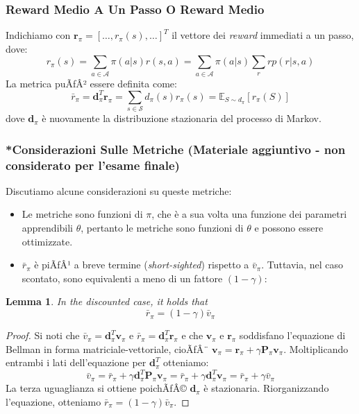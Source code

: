 ﻿\documentclass[11pt, a4paper]{report}
\newtheorem{lemma}{Lemma}
\begin{document}
\subsubsection{Reward Medio A Un Passo O Reward Medio}
Indichiamo con $\bm{r}_{\pi} = [\dots, r_{\pi}(s), \dots]^T$ il vettore dei \emph{reward} immediati a un passo, dove:
\begin{equation}
r_{\pi}(s) = \sum_{a \in \mathcal{A}} \pi(a|s) r(s, a) = \sum_{a \in \mathcal{A}} \pi(a|s) \sum_r r p(r|s, a)
\end{equation}
La metrica puÃƒÂ² essere definita come:
\begin{equation}
\bar{r}_{\pi} = \bm{d}_{\pi}^T \bm{r}_{\pi} = \sum_{s \in \mathcal{S}} d_{\pi}(s) r_{\pi}(s) = \mathbb{E}_{S \sim d_{\pi}} [r_{\pi}(S)]
\end{equation}
dove $\bm{d}_{\pi}$ è nuovamente la distribuzione stazionaria del processo di Markov.

\subsubsection{*Considerazioni Sulle Metriche {\normalfont\small(Materiale aggiuntivo - non considerato per l'esame finale)}}
Discutiamo alcune considerazioni su queste metriche:
\begin{itemize}
    \item Le metriche sono funzioni di $\pi$, che è a sua volta una funzione dei parametri apprendibili $\theta$, pertanto le metriche sono funzioni di $\theta$ e possono essere ottimizzate.
    \item $\bar{r}_{\pi}$ è piÃƒÂ¹ a breve termine (\emph{short-sighted}) rispetto a $\bar{v}_{\pi}$. Tuttavia, nel caso scontato, sono equivalenti a meno di un fattore $(1 - \gamma)$:
\end{itemize}

\begin{lemma}
In the discounted case, it holds that
\begin{equation}
\bar{r}_{\pi} = (1 - \gamma) \bar{v}_{\pi}
\end{equation}
\end{lemma}

\begin{proof}
Si noti che $\bar{v}_{\pi} = \bm{d}_{\pi}^T \bm{v}_{\pi}$ e $\bar{r}_{\pi} = \bm{d}_{\pi}^T \bm{r}_{\pi}$ e che $\bm{v}_{\pi}$ e $\bm{r}_{\pi}$ soddisfano l'equazione di Bellman in forma matriciale-vettoriale, cioÃƒÂ¨ $\bm{v}_{\pi} = \bm{r}_{\pi} + \gamma \bm{P}_{\pi} \bm{v}_{\pi}$. Moltiplicando entrambi i lati dell'equazione per $\bm{d}_{\pi}^T$ otteniamo:
\begin{equation}
\bar{v}_{\pi} = \bar{r}_{\pi} + \gamma \bm{d}_{\pi}^T \bm{P}_{\pi} \bm{v}_{\pi} = \bar{r}_{\pi} + \gamma \bm{d}_{\pi}^T \bm{v}_{\pi} = \bar{r}_{\pi} + \gamma \bar{v}_{\pi}
\end{equation}
La terza uguaglianza si ottiene poichÃƒÂ© $\bm{d}_{\pi}$ è stazionaria. Riorganizzando l'equazione, otteniamo $\bar{r}_{\pi} = (1 - \gamma) \bar{v}_{\pi}$.
\end{proof}
\end{document}
